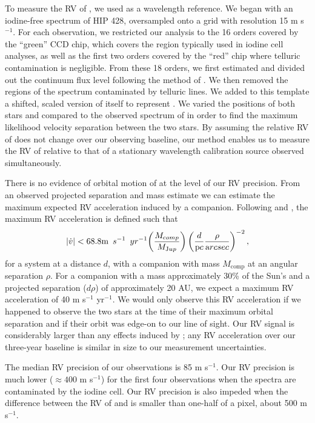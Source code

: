 To measure the RV of \LA, we used \LB{} as a wavelength reference. 
We began with an iodine-free spectrum of HIP 428, oversampled onto a grid with resolution 15 m s$^{-1}$.
For each observation, we restricted our analysis to the 16 orders covered by the ``green'' CCD chip, which covers the region typically used in iodine cell analyses, as well as the first two orders covered by the ``red'' chip where telluric contamination is negligible.
From these 18 orders, we first estimated and divided out the continuum flux level following the method of \citet{Pineda13}. 
We then removed the regions of the spectrum contaminated by telluric lines.
We added to this template a shifted, scaled version of itself to represent \LB.
We varied the positions of both stars and compared to the observed spectrum of \LHS{} in order to find the maximum likelihood velocity separation between the two stars.
By assuming the relative RV of \LB{} does not change over our observing baseline, our method enables us to measure the RV of \LA{} relative to that of a stationary wavelength calibration source observed simultaneously. 

There is no evidence of orbital motion of \LB{} at the level of our RV precision.
From an observed projected separation and mass estimate we can estimate the maximum expected RV acceleration induced by a companion.
Following \citet{Torres99} and \citet{Knutson14}, the maximum RV acceleration is defined such that 
\begin{equation}
\left|{\dot{v}}\right| < 68.8 {\textrm m\phantom{0}s^{-1}\phantom{0}yr^{-1}} \bigg( \frac{M_{\textrm comp}}{M_{\textrm Jup}}\bigg) \left(\frac{d}{\textrm pc}\frac{\rho}{\textrm arcsec}\right)^{-2},
\end{equation}
for a system at a distance $d$, with a companion with mass $M_\textrm{comp}$ at an angular separation $\rho$.
For a companion with a mass approximately 30\% of the Sun's and a projected separation ($d\rho$) of approximately 20 AU, we expect a maximum RV acceleration of 40 m s$^{-1}$ yr$^{-1}$.
We would only observe this RV acceleration if we happened to observe the two stars at the time of their maximum orbital separation and if their orbit was edge-on to our line of sight. 
Our RV signal is considerably larger than any effects induced by \LB; any RV acceleration over our three-year baseline is similar in size to our measurement uncertainties.

The median RV precision of our observations is 85 m s$^{-1}$.
Our RV precision is much lower ($\approx 400$ m s$^{-1}$) for the first four observations when the spectra are contaminated by the iodine cell. 
Our RV precision is also impeded when the difference between the RV of \LA{} and \LB{} is smaller than one-half of a pixel, about 500 m s$^{-1}$.

